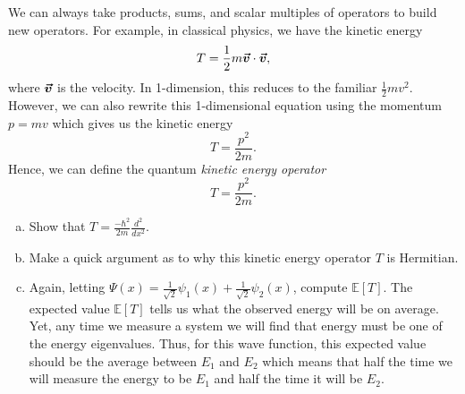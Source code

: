 \documentclass[12pt]{article} %
\begin{document}
\newpage
\begin{problem}
	We can always take products, sums, and scalar multiples of operators to build new operators.  For example, in classical physics, we have the kinetic energy
	\[
	T=\frac{1}{2}m \boldsymbol{\vec{v}} \cdot \boldsymbol{\vec{v}},
	\]
	where $\boldsymbol{\vec{v}}$ is the velocity. In 1-dimension, this reduces to the familiar $\frac{1}{2}mv^2$.  However, we can also rewrite this 1-dimensional equation using the momentum $p=mv$ which gives us the kinetic energy
	\[
	T=\frac{p^2}{2m}.
	\]
	Hence, we can define the quantum \emph{kinetic energy operator}
	\[
	T=\frac{p^2}{2m}.
	\]
	\begin{enumerate}[(a)]
		\item Show that $T = \frac{-\hbar^2}{2m}\frac{d^2}{dx^2}$.
		\item Make a quick argument as to why this kinetic energy operator $T$ is Hermitian.
		\item Again, letting $\Psi(x)=\frac{1}{\sqrt{2}}\psi_1(x)+\frac{1}{\sqrt{2}}\psi_2(x)$, compute $\mathbb{E}[T]$. The expected value $\mathbb{E}[T]$ tells us what the observed energy will be on average. Yet, any time we measure a system we will find that energy must be one of the energy eigenvalues. Thus, for this wave function, this expected value should be the average between $E_1$ and $E_2$ which means that half the time we will measure the energy to be $E_1$ and half the time it will be $E_2$.
	\end{enumerate}	
\end{problem}
\end{document}
